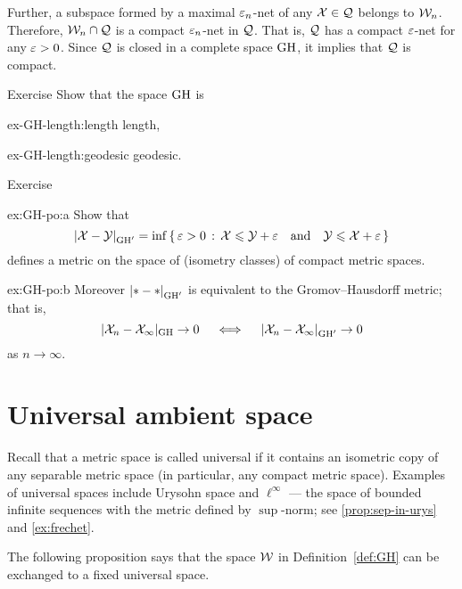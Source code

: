 Further, a subspace formed by a maximal $\varepsilon_n$-net of any $\mathcal{X}\in\mathcal{Q}$ belongs to $\mathcal{W}_n$.
Therefore, $\mathcal{W}_n\cap\mathcal{Q}$ is a compact $\varepsilon_n$-net in  $\mathcal{Q}$.
That is, $\mathcal{Q}$ has a compact $\varepsilon$-net for any $\varepsilon>0$.
Since $\mathcal{Q}$ is closed in a complete space $\operatorname{\rm GH}\nolimits$, it implies that $\mathcal{Q}$ is compact.
\qeds

\begin{thm}{Exercise}\label{ex-GH-length}
Show that the space $\operatorname{\rm GH}\nolimits$ is 

\begin{subthm}{ex-GH-length:length}
length,
\end{subthm}

\begin{subthm}{ex-GH-length:geodesic}
geodesic.
\end{subthm}

\end{thm}

\begin{thm}{Exercise}\label{ex:GH-po}
\begin{subthm}{ex:GH-po:a}
Show that 
$$\dist{\spc{X}}{\spc{Y}}{\GH'}=\inf\set{\eps>0}{\spc{X}\le \spc{Y}+\eps
\quad\text{and}\quad
\spc{Y}\le \spc{X}+\eps}$$
defines a metric on the space of (isometry classes) of compact metric spaces.
\end{subthm}

\begin{subthm}{ex:GH-po:b}
Moreover $\dist{*}{*}{\GH'}$ is equivalent to the Gromov--Hausdorff metric;
that is,
$$|\spc{X}_n-\spc{X}_\infty|_{\GH}\to 0 
\quad\iff\quad 
\dist{\spc{X}_n}{\spc{X}_\infty}{\GH'}\to 0$$ 
as $n\to\infty$.
\end{subthm}
\end{thm}

\section{Universal ambient space}

Recall that a metric space is called universal if it contains an isometric copy of any separable metric space (in particular, any compact metric space).
Examples of universal spaces include Urysohn space and $\ell^\infty$ --- the space of bounded infinite sequences with the metric defined by $\sup$-norm; see \ref{prop:sep-in-urys} and \ref{ex:frechet}.

The following proposition says that the space $\mathcal{W}$ in Definition~\ref{def:GH} can be exchanged to a fixed universal space.

